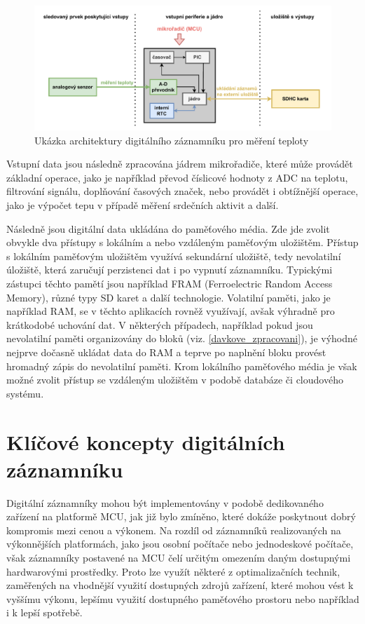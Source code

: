 \begin{figure}[h]
    \centering
    \includegraphics[width=1.00\textwidth]{obrazky-figures/recorder_mcu.pdf}
    
    \caption{Ukázka architektury digitálního záznamníku pro měření teploty}
    \label{fig:mcu-recorder}
\end{figure}

Vstupní data jsou následně zpracována jádrem mikrořadiče, které může provádět základní operace, jako je například převod číslicové hodnoty z ADC na teplotu, filtrování signálu, doplňování časových značek, nebo provádět i obtížnější operace, jako je výpočet tepu v případě měření srdečních aktivit a další.

Následně jsou digitální data ukládána do paměťového média. Zde jde zvolit obvykle dva přístupy s lokálním a nebo vzdáleným paměťovým uložištěm. Přístup s lokálním paměťovým uložištěm využívá sekundární uložiště, tedy nevolatilní úložiště, která zaručují perzistenci dat i po vypnutí záznamníku. Typickými zástupci těchto pamětí jsou například FRAM (Ferroelectric Random Access Memory), různé typy SD karet a další technologie. Volatilní paměti, jako je například RAM, se v těchto aplikacích rovněž využívají, avšak výhradně pro krátkodobé uchování dat. V některých případech, například pokud jsou nevolatilní paměti organizovány do bloků (viz. \ref{davkove_zpracovani}), je výhodné nejprve dočasně ukládat data do RAM a teprve po naplnění bloku provést hromadný zápis do nevolatilní paměti. Krom lokálního paměťového média je však možné zvolit přístup se vzdáleným uložištěm v podobě databáze či cloudového systému.


\section{Klíčové koncepty digitálních záznamníku} 
\label{klicove_koncepty_digitalnich_zaznamniku}
Digitální záznamníky mohou být implementovány v podobě dedikovaného zařízení na platformě MCU, jak již bylo zmíněno, které dokáže poskytnout dobrý kompromis mezi cenou a výkonem. Na rozdíl od záznamníků realizovaných na výkonnějších platformách, jako jsou osobní počítače nebo jednodeskové počítače, však záznamníky postavené na MCU čelí určitým omezením daným dostupnými hardwarovými prostředky. Proto lze využít některé z optimalizačních technik, zaměřených na vhodnější využití dostupných zdrojů zařízení, které mohou vést k vyššímu výkonu, lepšímu využití dostupného paměťového prostoru nebo například i k lepší spotřebě.

